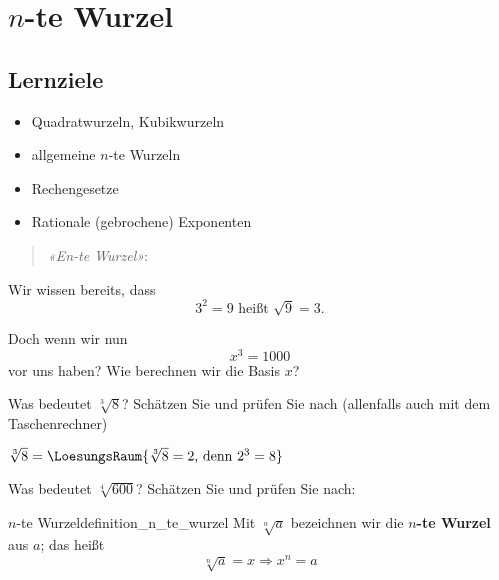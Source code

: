 
\section{$n$-te Wurzel}

\subsection*{Lernziele}

\begin{itemize}
\item Quadratwurzeln, Kubikwurzeln
\item allgemeine $n$-te Wurzeln
\item Rechengesetze
\item Rationale (gebrochene) Exponenten
\end{itemize}
\newpage


\begin{verse}
\textit{«En-te Wurzel»}:
\end{verse}

Wir wissen bereits, dass
$$3^2 = 9 \text{ heißt } \sqrt{9} = 3.$$



Doch wenn wir nun
$$x^3 = 1000$$
vor uns haben? Wie berechnen wir die Basis $x$?



Was bedeutet $\sqrt[3]{8}$? Schätzen Sie und prüfen Sie nach
(allenfalls auch mit dem Taschenrechner)

$\sqrt[3]{8} =  \LoesungsRaum{\sqrt[3]{8}=2 \text{, denn } 2^3=8}$

Was bedeutet $\sqrt[4]{600}$? Schätzen Sie und prüfen Sie nach: 






\newpage
\begin{definition}{$n$-te Wurzel}{definition_n_te_wurzel}
Mit $\sqrt[n]{a}$ bezeichnen wir die $n$\textbf{-te Wurzel} aus $a$; das heißt
$$\sqrt[n]{a} = x \Rightarrow x^n = a$$
\end{definition}

